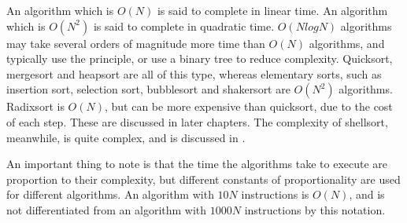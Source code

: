 An algorithm which is $O(N)$ is said to complete in linear time. An algorithm
which is $O(N^2)$ is said to complete in quadratic time.  $O(NlogN)$ algorithms
may take several orders of magnitude more time than $O(N)$ algorithms, and
typically use the  principle, or use a binary tree to
reduce complexity. Quicksort, mergesort and heapsort are all of this type,
whereas elementary sorts, such as insertion sort, selection sort, bubblesort and
shakersort are $O(N^2)$ algorithms. Radixsort is $O(N)$, but can be more
expensive than quicksort, due to the cost of each step. These are discussed in
later chapters. The complexity of shellsort, meanwhile, is quite complex, and is
discussed in \cite{Sedgewick96}.

An important thing to note is that the time the algorithms take to execute are
proportion to their complexity, but different constants of proportionality are
used for different algorithms. An algorithm with $10N$ instructions is $O(N)$,
and is not differentiated from an algorithm with $1000N$ instructions by this
notation.
